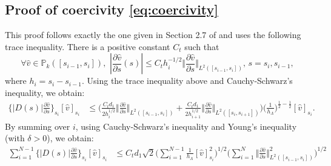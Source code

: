 \documentclass[pdflatex,sn-mathphys-num]{sn-jnl}%
\theoremstyle{thmstyleone}%
\theoremstyle{thmstyletwo}%
\theoremstyle{thmstylethree}%
\begin{document}
\begin{appendices}
\section{Proof of coercivity \eqref{eq:coercivity}}
\label{sec:appd}
This proof follows exactly  the one given in  Section 2.7 of \cite{riviere2008discontinuous} and uses
the following trace inequality. There is a positive constant $C_t$ such that
\begin{equation}\label{eq:trace}
\forall \hat v \in \mathbb{P}_k([s_{i-1},s_i]), \,\, \left\vert \frac{\partial \hat v}{\partial s} (s)\right\vert\leq C_t h_i^{-1/2} \Vert  \frac{\partial \hat v}{\partial s} \Vert_{L^2([s_{i-1},s_i])},
\, s  = s_i, s_{i-1}, 
\end{equation}
where $h_i = s_i-s_{i-1}$. 
Using the trace inequality above and Cauchy-Schwarz's inequality, we obtain:
\begin{align*}
  \{ |D(s)|\frac{\partial \hat v}{\partial s}\}_{s_i} [\hat v]_{s_i}  &\leq \Big( \frac{C_t d_1}{2 h^{1/2}_{i}} \Vert \frac{\partial \hat v}{\partial s}\Vert_{L^2([s_{i-1},s_i])} + \frac{C_t d_1}{2 h_{i+1}^{1/2}} \Vert \frac{\partial  \hat v}{\partial s}\Vert_{L^2([s_i,s_{i+1}])} \Big) \Big(\frac{1}{h_\Lambda}\Big)^{\frac{1}{2}-\frac{1}{2}} [\hat v]_{s_i}.
\end{align*}
By summing over $i$, using Cauchy-Schwarz's inequality and Young's inequality (with $\delta>0$), we obtain:
\begin{align*}
    \sum_{i=1}^{N-1}\{ |D(s)|\frac{\partial \hat v}{\partial s}\}_{s_i} [\hat v]_{s_i} &\leq C_td_1\sqrt{2} \Big( \sum_{i=1}^{N-1} \frac{1}{h_\Lambda} [\hat v]^2_{s_i}\Big)^{1/2} \Big( \sum_{i=1}^{N} \Vert \frac{\partial \hat v}{\partial s} \Vert^2_{L^2([s_{i-1},s_i])}\Big)^{1/2} \\

\end{align*}
\end{appendices}
\end{document}
